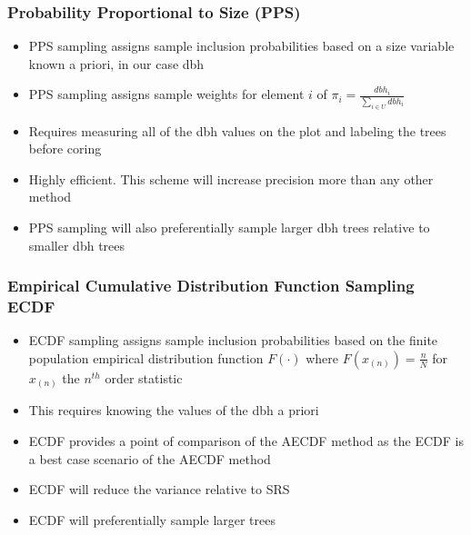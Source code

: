 \documentclass{beamer}
\begin{document}
%
\begin{frame}
  \frametitle{Probability Proportional to Size (PPS)}
  \begin{itemize}
    \item PPS sampling assigns sample inclusion probabilities based on a size variable known a priori, in our case dbh \vspace{3mm}
    \item PPS sampling assigns sample weights for element $i$ of $\pi_i = \frac{dbh_i} {\sum_{i \in U} dbh_i}$ \vspace{3mm}
    \item Requires measuring all of the dbh values on the plot and labeling the trees before coring \vspace{3mm}
    \item Highly efficient. This scheme will increase precision more than any other method \vspace{3mm}
    \item PPS sampling will also preferentially sample larger dbh trees relative to smaller dbh trees \vspace{3mm}
  \end{itemize}
\end{frame}
%
\begin{frame}
  \frametitle{Empirical Cumulative Distribution Function Sampling ECDF}
  \begin{itemize} 
    \item ECDF sampling assigns sample inclusion probabilities based on the finite population empirical distribution function $F(\cdot)$ where $F(x_{(n)}) = \frac{n} {N}$ for $x_{(n)}$ the $n^{th}$ order statistic \vspace{3mm}
    \item This requires knowing the values of the dbh a priori \vspace{3mm}
    \item ECDF provides a point of comparison of the AECDF method as the ECDF is a best case scenario of the AECDF method \vspace{3mm}
    \item ECDF will reduce the variance relative to SRS \vspace{3mm}
    \item ECDF will preferentially sample larger trees
  \end{itemize}    
\end{frame}
%
\end{document}

